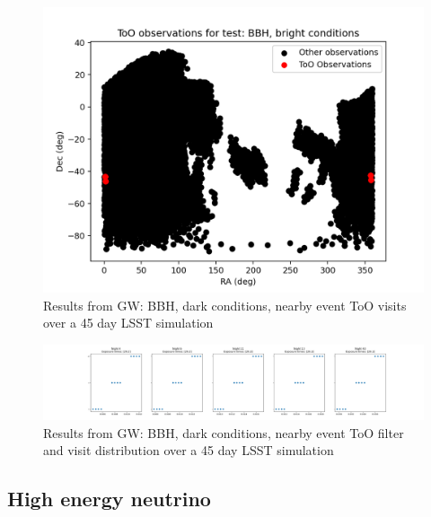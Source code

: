\begin{figure}
    \centering
    \includegraphics[width=\linewidth]{figures/validationTests/SVRequired/BBHBrightPosition.png}
    \caption{Results from GW: BBH, dark conditions, nearby event ToO visits over a 45 day LSST simulation}
    \label{fig:GWBrightPositionResult}
\end{figure}

\begin{figure}
    \centering
    \includegraphics[width=\linewidth]{figures/validationTests/SVRequired/BBHBrightFilterPlot.png}
    \caption{Results from GW: BBH, dark conditions, nearby event ToO filter and visit distribution over a 45 day LSST simulation}
    \label{fig:GWBrightFilterResult}
\end{figure}
\newpage

\subsection{High energy neutrino}

